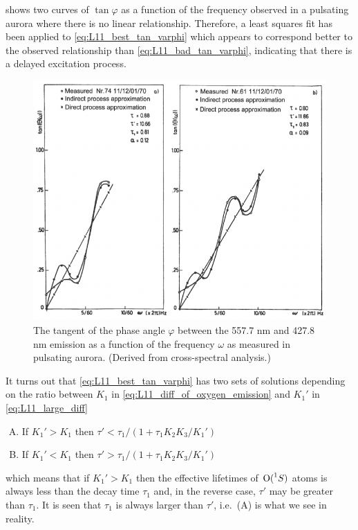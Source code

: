  shows two curves of \(\tan\varphi \) as a function of the frequency observed in a pulsating aurora where there is no linear relationship. Therefore, a least squares fit has been applied to \cref{eq:L11_best_tan_varphi} which appears to correspond better to the observed relationship than \cref{eq:L11_bad_tan_varphi}, indicating that there is a delayed excitation process.
\begin{figure}[t]
    \centering
    \includegraphics[width=.6\linewidth]{bilder/L11_tan_varphi.png}
    \caption{The tangent of the phase angle \(\varphi \) between the 557.7 nm and 427.8 nm emission as a function of the frequency \(\omega \) as measured in pulsating aurora. (Derived from cross-spectral analysis.)}\label{fig_L11_tan_varphi}
\end{figure}

It turns out that \cref{eq:L11_best_tan_varphi} has two sets of solutions depending on the ratio between \(K_1\) in \cref{eq:L11_diff_of_oxygen_emission} and \(K_1'\) in \cref{eq:L11_large_diff}
\begin{enumerate}[(A)]
    \item If \(K_1'>K_1\) then \(\tau'<\tau_1/\left(1+\tau_1K_2K_3/K_1'\right)\)
    \item If \(K_1'<K_1\) then \(\tau'>\tau_1/\left(1+\tau_1K_2K_3/K_1'\right)\)
\end{enumerate}
which means that if \(K_1'>K_1\) then the effective lifetimes of \(\prescript{}{}{\textnormal{O}}(\prescript{1}{}{S})\) atoms is always less than the decay time \(\tau_1\) and, in the reverse case, \(\tau'\) may be greater than \(\tau_1\). It is seen that \(\tau_1\) is always larger than \(\tau'\), i.e.\ (A) is what we see in reality.